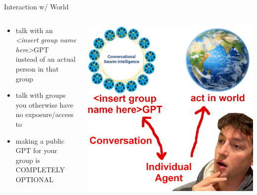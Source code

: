 \documentclass[aspectratio=169]{beamer}
\begin{document}
\begin{frame}{Interaction w/ World}
\begin{columns}[T]
    \begin{column}[T]{0.5\textwidth}
        \begin{itemize}
            \item talk with an\\ \textit{<insert group name here>}GPT\\ instead of an actual person in that group
            \item talk with groups you otherwise have no exposure/access to
            \item making a public GPT for your group is COMPLETELY OPTIONAL
        \end{itemize}
    \end{column}
    \begin{column}{0.5\textwidth}
        \includegraphics[height=0.8\textheight]{imgs/CSI_section/agency.png}
    \end{column}
\end{columns}
\end{frame}
\end{document}
